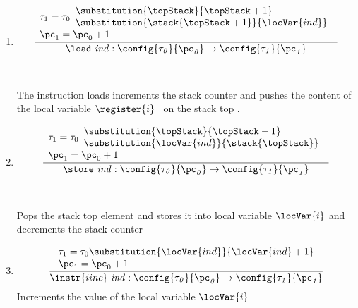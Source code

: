 \begin{itemize}
\begin{enumerate}
	\item \load
	$$ \frac{ \begin{array}{l} \tau_{1} = \tau_{0}  \begin{array}{l}
	                                                   \substitution{\topStack}{\topStack + 1}\\
							    \substitution{\stack{\topStack + 1} } {\locVar{ind} }
							\end{array} \\
               \pc_1 = \pc_0 + 1 
		\end{array} 
	    } 
	    {\load \ \it{ind} : \config{\tau_{0}}{\pc_0} \rightarrow \config{\tau_{1}}{\pc_1}} $$ \\\\
            The instruction loads increments the stack counter  \topStack and pushes
	    the content of the local variable $\register{i}$ \ on the stack top .
	    
        \item \store
        $$ \frac{  \begin{array}{l}\tau_{1} = \tau_{0}   \begin{array}{l} 
                                                        \substitution{\topStack}{\topStack - 1} \\
		                                        \substitution {\locVar{ind}}{\stack{\topStack} } 
						\end{array} 	 \\     
               \pc_1 =\pc_0  + 1 
		\end{array}  }
                { \store \ \it{ind} :  \config{\tau_{0}}{\pc_0} \rightarrow \config{\tau_{1}}{\pc_1} }  $$ \\\\
	     Pops the stack top element \stack{\topStack}  and stores it into local variable $\locVar{i}  $ and  decrements the stack counter 
	     \topStack  
	
        \item  {}

                $$\frac{ \begin{array}{l}
	                \tau_{1} = \tau_{0} \substitution{\locVar{ind}}{\locVar{ind} + 1 } \\
                       \pc_1 =\pc_0  + 1 
 	          \end{array}
	        } 
	        {\instr{iinc } \ \it{ ind}  :  \config{\tau_{0}}{\pc_0} \rightarrow \config{\tau_{1}}{\pc_1} } $$
            Increments the value of the local variable $\locVar{i}$ 
	

\end{enumerate}
\end{itemize}
